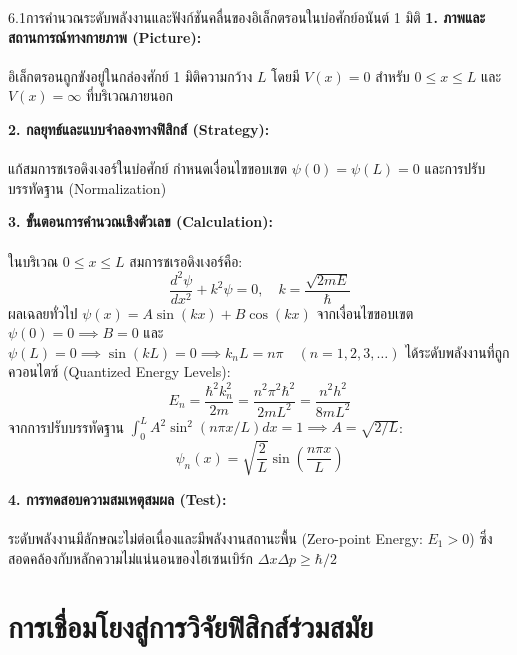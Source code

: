 \begin{psctexample}{6.1}{การคำนวณระดับพลังงานและฟังก์ชันคลื่นของอิเล็กตรอนในบ่อศักย์อนันต์ 1 มิติ}
\textbf{1. ภาพและสถานการณ์ทางกายภาพ (Picture):}\\\\ อิเล็กตรอนถูกขังอยู่ในกล่องศักย์ 1 มิติความกว้าง $L$ โดยมี $V(x) = 0$ สำหรับ $0 \le x \le L$ และ $V(x) = \infty$ ที่บริเวณภายนอก

\vspace{4pt}
\textbf{2. กลยุทธ์และแบบจำลองทางฟิสิกส์ (Strategy):}\\\\ แก้สมการชเรอดิงเงอร์ในบ่อศักย์ กำหนดเงื่อนไขขอบเขต $\psi(0) = \psi(L) = 0$ และการปรับบรรทัดฐาน (Normalization)

\vspace{4pt}
\textbf{3. ขั้นตอนการคำนวณเชิงตัวเลข (Calculation):}\\\\ ในบริเวณ $0 \le x \le L$ สมการชเรอดิงเงอร์คือ:
\begin{equation}
\frac{d^2\psi}{dx^2} + k^2\psi = 0, \quad k = \frac{\sqrt{2mE}}{\hbar}
\end{equation}
ผลเฉลยทั่วไป $\psi(x) = A\sin(kx) + B\cos(kx)$
จากเงื่อนไขขอบเขต $\psi(0) = 0 \implies B = 0$
และ $\psi(L) = 0 \implies \sin(kL) = 0 \implies k_n L = n\pi \quad (n = 1, 2, 3, \dots)$
ได้ระดับพลังงานที่ถูกควอนไตซ์ (Quantized Energy Levels):
\begin{equation}
E_n = \frac{\hbar^2 k_n^2}{2m} = \frac{n^2 \pi^2 \hbar^2}{2mL^2} = \frac{n^2 h^2}{8mL^2}
\end{equation}
จากการปรับบรรทัดฐาน $\int_{0}^{L} A^2 \sin^2(n\pi x/L) dx = 1 \implies A = \sqrt{2/L}$:
\begin{equation}
\psi_n(x) = \sqrt{\frac{2}{L}} \sin\left(\frac{n\pi x}{L}\right)
\end{equation}

\vspace{4pt}
\textbf{4. การทดสอบความสมเหตุสมผล (Test):}\\\\ ระดับพลังงานมีลักษณะไม่ต่อเนื่องและมีพลังงานสถานะพื้น (Zero-point Energy: $E_1 > 0$) ซึ่งสอดคล้องกับหลักความไม่แน่นอนของไฮเซนเบิร์ก $\Delta x \Delta p \ge \hbar/2$
\end{psctexample}

\section{การเชื่อมโยงสู่การวิจัยฟิสิกส์ร่วมสมัย}

